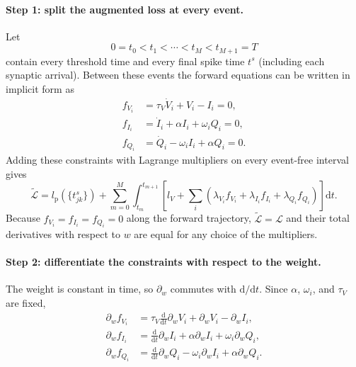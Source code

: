 \paragraph{Step 1: split the augmented loss at every event.}
Let
\begin{equation}
    0=t_0<t_1<\cdots<t_M<t_{M+1}=T
\end{equation}
contain every threshold time and every final spike time $t^s$ (including each
synaptic arrival). Between these events the forward equations can be written
in implicit form as
\begin{align}
    f_{V_i}&=\tau_V\dot V_i+V_i-I_i=0,\\
    f_{I_i}&=\dot I_i+\alpha I_i+\omega_iQ_i=0,\\
    f_{Q_i}&=\dot Q_i-\omega_iI_i+\alpha Q_i=0.
    \label{eq:tes-implicit-flow}
\end{align}
Adding these constraints with Lagrange multipliers on every event-free interval
gives
\begin{equation}
    \widetilde{\mathcal L}
      =l_{\mathrm p}\!\left(\{t^s_{jk}\}\right)
       +\sum_{m=0}^{M}\int_{t_m}^{t_{m+1}}
        \left[
          l_V
          +\sum_i\left(
             \lambda_{V_i}f_{V_i}
            +\lambda_{I_i}f_{I_i}
            +\lambda_{Q_i}f_{Q_i}
          \right)
        \right]\mathrm dt.
    \label{eq:tes-augmented-loss}
\end{equation}
Because $f_{V_i}=f_{I_i}=f_{Q_i}=0$ along the forward trajectory,
$\widetilde{\mathcal L}=\mathcal L$ and their total derivatives with respect
to $w$ are equal for any choice of the multipliers.

\paragraph{Step 2: differentiate the constraints with respect to the weight.}
The weight is constant in time, so $\partial_w$ commutes with
$\mathrm d/\mathrm dt$. Since $\alpha$, $\omega_i$, and $\tau_V$ are fixed,
\begin{align}
    \partial_w f_{V_i}
      &=\tau_V\frac{\mathrm d}{\mathrm dt}\partial_w V_i
        +\partial_w V_i-\partial_w I_i,
        \label{eq:tes-differentiate-fv}\\
    \partial_w f_{I_i}
      &=\frac{\mathrm d}{\mathrm dt}\partial_w I_i
        +\alpha\partial_w I_i+\omega_i\partial_w Q_i,
        \label{eq:tes-differentiate-fi}\\
    \partial_w f_{Q_i}
      &=\frac{\mathrm d}{\mathrm dt}\partial_w Q_i
        -\omega_i\partial_w I_i+\alpha\partial_w Q_i.
        \label{eq:tes-differentiate-fq}
\end{align}

